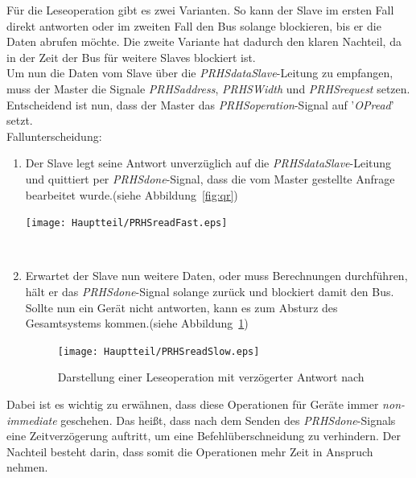 Für die Leseoperation gibt es zwei Varianten. So kann der Slave im ersten Fall
direkt antworten oder im zweiten Fall den Bus solange blockieren, bis er die Daten
abrufen möchte. Die zweite Variante hat dadurch den klaren Nachteil, da in der Zeit
der Bus für weitere Slaves blockiert ist. \\
Um nun die Daten vom Slave über die \emph{PRHSdataSlave}-Leitung zu empfangen,
muss der Master die Signale \emph{PRHSaddress}, \emph{PRHSWidth} und \emph{PRHSrequest} setzen.
Entscheidend ist nun, dass der Master das \emph{PRHSoperation}-Signal auf '\emph{OPread}' setzt. \\
Fallunterscheidung:\\
\begin{enumerate}
\item Der Slave legt seine Antwort unverzüglich auf die \emph{PRHSdataSlave}-Leitung
      und quittiert per \emph{PRHSdone}-Signal, dass die vom Master gestellte
      Anfrage bearbeitet wurde.(siehe Abbildung~\ref{fig:qr})

\begin{centering}
\texttt{[image: Hauptteil/PRHSreadFast.eps]}
\label{fig:qr}
\end{centering}



\ \item Erwartet der Slave nun weitere Daten, oder muss Berechnungen durchführen, hält er das
      \emph{PRHSdone}-Signal solange zurück und blockiert damit den Bus. Sollte nun ein Gerät
       nicht antworten, kann es zum Absturz des Gesamtsystems kommen.(siehe Abbildung~\ref{fig:sr})\\

\begin{figure}[h!]
\centering
\texttt{[image: Hauptteil/PRHSreadSlow.eps]}
\caption{Darstellung einer Leseoperation mit verzögerter Antwort nach \cite{MEckertDiss}}
\label{fig:sr}
\end{figure}

\end{enumerate}

Dabei ist es wichtig zu erwähnen, dass diese Operationen für Geräte immer \emph{non-immediate} geschehen. Das heißt,
 dass nach dem Senden des \emph{PRHSdone}-Signals eine Zeitverzögerung auftritt, um eine Befehlüberschneidung
 zu verhindern. Der Nachteil besteht darin, dass somit die Operationen mehr Zeit in Anspruch nehmen.\\

